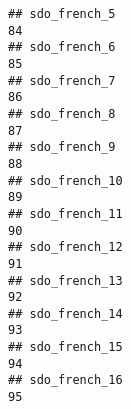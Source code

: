\documentclass[
]{article}
\begin{document}
\begin{verbatim}
## sdo_french_5                                                                                                                                                                                                                 84
## sdo_french_6                                                                                                                                                                                                                 85
## sdo_french_7                                                                                                                                                                                                                 86
## sdo_french_8                                                                                                                                                                                                                 87
## sdo_french_9                                                                                                                                                                                                                 88
## sdo_french_10                                                                                                                                                                                                                89
## sdo_french_11                                                                                                                                                                                                                90
## sdo_french_12                                                                                                                                                                                                                91
## sdo_french_13                                                                                                                                                                                                                92
## sdo_french_14                                                                                                                                                                                                                93
## sdo_french_15                                                                                                                                                                                                                94
## sdo_french_16                                                                                                                                                                                                                95

\end{verbatim}
\end{document}
